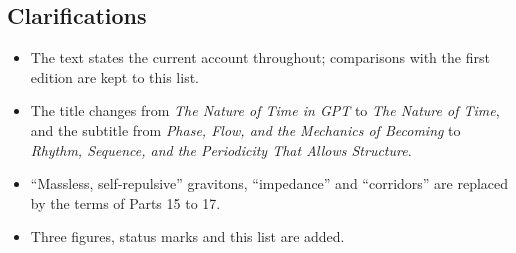 \documentclass[11pt,a4paper]{article}
\begin{document}
\subsection*{Clarifications}
\begin{itemize}
\item The text states the current account throughout; comparisons with the first edition are kept to this list.
\item The title changes from \emph{The Nature of Time in GPT} to \emph{The Nature of Time}, and the subtitle from \emph{Phase, Flow, and the Mechanics of Becoming} to \emph{Rhythm, Sequence, and the Periodicity That Allows Structure}.
\item ``Massless, self-repulsive'' gravitons, ``impedance'' and ``corridors'' are replaced by the terms of Parts 15 to 17.
\item Three figures, status marks and this list are added.
\end{itemize}

\newpage


\end{document}

